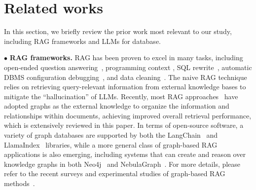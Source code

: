 \section{Related works}
\label{sec:related}
In this section, we briefly review the prior work most relevant to our study, including RAG frameworks and LLMs for database.

$\bullet$ \textbf{RAG frameworks.} RAG has been proven
to excel in many tasks, including open-ended question answering~\cite{jeong2024adaptive,siriwardhana2023improving}, programming context \cite{chen2024auto,chen2023haipipe,chen2024automatic}, SQL rewrite~\cite{lillm,sun2024r}, automatic DBMS configuration debugging~\cite{zhou2023d,singh2024panda}, and data cleaning~\cite{naeem2024retclean,narayan2022can,qian2024unidm}.
%
The naive RAG technique relies on retrieving query-relevant information from external knowledge bases to mitigate the ``hallucination'' of LLMs.
% 
Recently, most RAG approaches~\cite{wu2024medical,wang2024knowledge,li2024dalk,gutierrez2024hipporag,edge2024local,guo2024lightrag,sarthi2024raptor,peng2024graph} have adopted graphs as the external knowledge to organize the information and relationships within documents, achieving improved overall retrieval performance, which is extensively reviewed in this paper. 
%
In terms of open-source software, a variety of graph databases are
supported by both the LangChain~\cite{Langchain} and LlamaIndex~\cite{llamaindex} libraries,
while a more general class of graph-based RAG applications is also emerging, including systems that
can create and reason over knowledge graphs in both Neo4j~\cite{neo4j} and NebulaGraph~\cite{nebula}. 
%
For more details, please refer to the recent surveys and experimental studies of graph-based RAG methods~\cite{peng2024graph,han2024retrieval,zhou2026indepth}.

